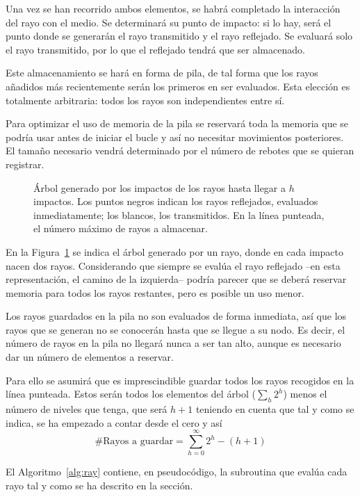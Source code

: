 Una vez se han recorrido ambos elementos, se habrá completado la interacción del rayo con el medio.
Se determinará su punto de impacto: si lo hay, será el punto donde se generarán el rayo transmitido y el rayo reflejado.
Se evaluará solo el rayo transmitido, por lo que el reflejado tendrá que ser almacenado.

Este almacenamiento se hará en forma de pila, de tal forma que los rayos añadidos más recientemente serán los primeros en ser evaluados.
Esta elección es totalmente arbitraria: todos los rayos son independientes entre sí.

Para optimizar el uso de memoria de la pila se reservará toda la memoria que se podría usar antes de iniciar el bucle y así no necesitar movimientos posteriores.
El tamaño necesario vendrá determinado por el número de rebotes que se quieran registrar.

\begin{figure}[H]
    \centering
    
    \caption{Árbol generado por los impactos de los rayos hasta llegar a $h$ impactos. Los puntos negros indican los rayos reflejados, evaluados inmediatamente; los blancos, los transmitidos. En la línea punteada, el número máximo de rayos a almacenar.}
    \label{fig:memoria_pila}
\end{figure}

En la Figura~\ref{fig:memoria_pila} se indica el árbol generado por un rayo, donde en cada impacto nacen dos rayos.
Considerando que siempre se evalúa el rayo reflejado --en esta representación, el camino de la izquierda-- podría parecer que se deberá reservar memoria para todos los rayos restantes, pero es posible un uso menor.

Los rayos guardados en la pila no son evaluados de forma inmediata, así que los rayos que se generan no se conocerán hasta que se llegue a su nodo.
Es decir, el número de rayos en la pila no llegará nunca a ser tan alto, aunque es necesario dar un número de elementos a reservar.

Para ello se asumirá que es imprescindible guardar todos los rayos recogidos en la línea punteada.
Estos serán todos los elementos del árbol ($\sum_h 2^h$) menos el número de niveles que tenga, que será $h+1$ teniendo en cuenta que tal y como se indica, se ha empezado a contar desde el cero y así
\begin{equation}
    \text{\# Rayos a guardar} = \sum_{h=0}^{\infty} 2^h - (h+1)
\end{equation}

El Algoritmo~\ref{alg:ray} contiene, en pseudocódigo, la subroutina que evalúa cada rayo tal y como se ha descrito en la sección.

